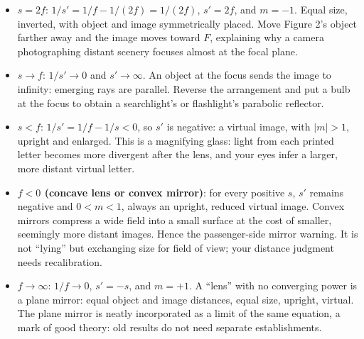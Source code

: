 \begin{mainline}
\begin{itemize}
\textbf{Translator safety note:} Do not reproduce the burning example. Concentrated sunlight can injure eyes and ignite materials; keep lenses away from direct sunlight when not in controlled use. See \href{https://science.nasa.gov/eclipses/safety/}{NASA eye-safety guidance} and \href{https://www.london-fire.gov.uk/incidents/2022/january/flat-fire-bow/}{London Fire Brigade's sunlight-fire warning}.
  \item \textbf{$s=2f$}: $1/s'=1/f-1/(2f)=1/(2f)$, $s'=2f$, and $m=-1$. Equal size, inverted, with object and image symmetrically placed. Move Figure 2's object farther away and the image moves toward $F$, explaining why a camera photographing distant scenery focuses almost at the focal plane.
  \item \textbf{$s\to f$}: $1/s'\to0$ and $s'\to\infty$. An object at the focus sends the image to infinity: emerging rays are parallel. Reverse the arrangement and put a bulb at the focus to obtain a searchlight's or flashlight's parabolic reflector.
  \item \textbf{$s<f$}: $1/s'=1/f-1/s<0$, so $s'$ is negative: a virtual image, with $|m|>1$, upright and enlarged. This is a magnifying glass: light from each printed letter becomes more divergent after the lens, and your eyes infer a larger, more distant virtual letter.
  \item \textbf{$f<0$ (concave lens or convex mirror)}: for every positive $s$, $s'$ remains negative and $0<m<1$, always an upright, reduced virtual image. Convex mirrors compress a wide field into a small surface at the cost of smaller, seemingly more distant images. Hence the passenger-side mirror warning. It is not ``lying'' but exchanging size for field of view; your distance judgment needs recalibration.
  \item \textbf{$f\to\infty$}: $1/f\to0$, $s'=-s$, and $m=+1$. A ``lens'' with no converging power is a plane mirror: equal object and image distances, equal size, upright, virtual. The plane mirror is neatly incorporated as a limit of the same equation, a mark of good theory: old results do not need separate establishments.
\end{itemize}


\end{mainline}
